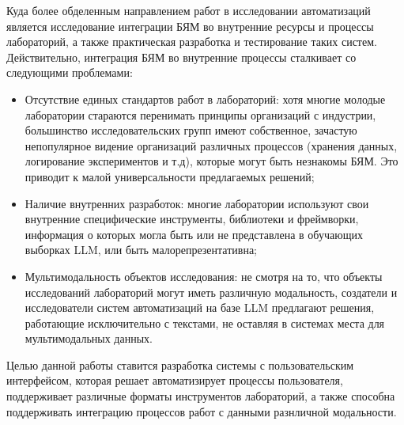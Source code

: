 Куда более обделенным направлением работ в исследовании автоматизаций является 
исследование интеграции БЯМ во внутренние ресурсы и процессы лабораторий, 
а также практическая разработка и тестирование таких систем. 
Действительно, интеграция БЯМ во внутренние процессы сталкивает со следующими проблемами:
\begin{itemize}
	\item Отсутствие единых стандартов работ в лабораторий: хотя многие молодые лаборатории
стараются перенимать принципы организаций с индустрии, большинство исследовательских групп
имеют собственное, зачастую непопулярное видение организаций различных процессов 
(хранения данных, логирование экспериментов и т.д), которые могут быть незнакомы БЯМ. Это
приводит к малой универсальности предлагаемых решений;
	\item Наличие внутренних разработок: многие лаборатории используют свои внутренние 
специфические инструменты, библиотеки и фреймворки, информация о которых могла 
быть или не представлена в обучающих выборках LLM, или быть малорепрезентативна;
	\item Мультимодальность объектов исследования: не смотря на то, что объекты исследований
лабораторий могут иметь различную модальность, создатели и исследователи 
систем автоматизаций на базе LLM предлагают решения, работающие исключительно с 
текстами, не оставляя в системах места для мультимодальных данных.  
\end{itemize}

Целью данной работы ставится разработка системы с пользовательским интерфейсом, которая 
решает автоматизирует процессы пользователя, поддерживает различные форматы инструментов 
лабораторий, а также способна поддерживать интеграцию процессов работ с данными разнличной
модальности.

\newpage
